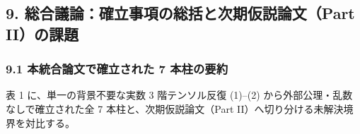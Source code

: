 \documentclass[
  a4paper,
]{ltjsarticle}
\begin{document}
\subsection{9. 総合議論：確立事項の総括と次期仮説論文（Part
II）の課題}\label{ux7dcfux5408ux8b70ux8ad6ux78baux7acbux4e8bux9805ux306eux7dcfux62ecux3068ux6b21ux671fux4eeeux8aacux8ad6ux6587part-iiux306eux8ab2ux984c}

\subsubsection{9.1 本統合論文で確立された 7
本柱の要約}\label{ux672cux7d71ux5408ux8ad6ux6587ux3067ux78baux7acbux3055ux308cux305f-7-ux672cux67f1ux306eux8981ux7d04}

表 1 に、単一の背景不要な実数 3 階テンソル反復 (1)--(2)
から外部公理・乱数なしで確立された全 7 本柱と、次期仮説論文（Part
II）へ切り分ける未解決境界を対比する。
\end{document}
